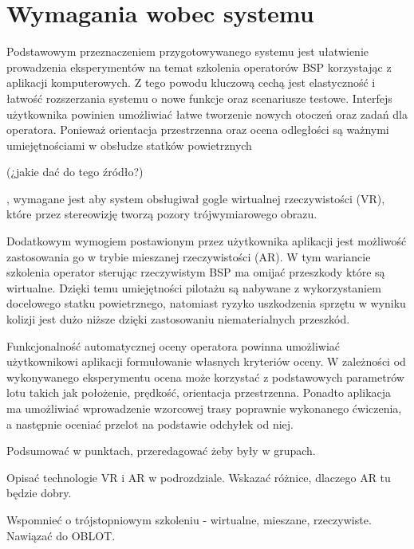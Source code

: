 \newpage
\section{Wymagania wobec systemu}

Podstawowym przeznaczeniem przygotowywanego systemu jest ułatwienie prowadzenia eksperymentów na temat szkolenia operatorów BSP korzystając z aplikacji komputerowych. Z tego powodu kluczową cechą jest elastyczność i łatwość rozszerzania systemu o nowe funkcje oraz scenariusze testowe. Interfejs użytkownika powinien umożliwiać łatwe tworzenie nowych otoczeń oraz zadań dla operatora. Ponieważ orientacja przestrzenna oraz ocena odległości są ważnymi umiejętnościami w obsłudze statków powietrznych \begin{todo}(¿jakie dać do tego źródło?)\end{todo}, wymagane jest aby system obsługiwał gogle wirtualnej rzeczywistości (VR), które przez stereowizję tworzą pozory trójwymiarowego obrazu.

Dodatkowym wymogiem postawionym przez użytkownika aplikacji jest możliwość zastosowania go w trybie mieszanej rzeczywistości (AR). W tym wariancie szkolenia operator sterując rzeczywistym BSP ma omijać przeszkody które są wirtualne. Dzięki temu umiejętności pilotażu są nabywane z wykorzystaniem docelowego statku powietrznego, natomiast ryzyko uszkodzenia sprzętu w wyniku kolizji jest dużo niższe dzięki zastosowaniu niematerialnych przeszkód.

Funkcjonalność automatycznej oceny operatora powinna umożliwiać użytkownikowi aplikacji formułowanie własnych kryteriów oceny. W zależności od wykonywanego eksperymentu ocena może korzystać z podstawowych parametrów lotu takich jak położenie, prędkość, orientacja przestrzenna. Ponadto aplikacja ma umożliwiać wprowadzenie wzorcowej trasy poprawnie wykonanego ćwiczenia, a następnie oceniać przelot na podstawie odchyłek od niej.

\begin{todo}
Podsumować w punktach, przeredagować żeby były w grupach.

Opisać technologie VR i AR w podrozdziale. Wskazać różnice, dlaczego AR tu będzie dobry.

Wspomnieć o trójstopniowym szkoleniu - wirtualne, mieszane, rzeczywiste. Nawiązać do OBLOT.
\end{todo}